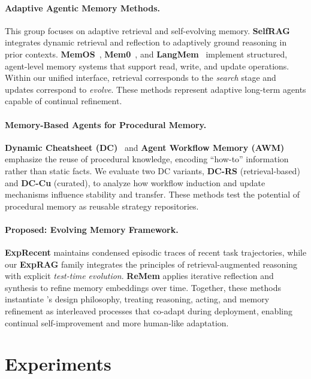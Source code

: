 \paragraph{Adaptive Agentic Memory Methods.}
This group focuses on adaptive retrieval and self-evolving memory. \textbf{SelfRAG}~\citep{asai2023self} integrates dynamic retrieval and reflection to adaptively ground reasoning in prior contexts.  
\textbf{MemOS}~\citep{Li2025MemOSAO}, \textbf{Mem0}~\citep{mem0}, and \textbf{LangMem}~\citep{langchain} implement structured, agent-level memory systems that support read, write, and update operations. Within our unified interface, retrieval corresponds to the \emph{search} stage and updates correspond to \emph{evolve}. These methods represent adaptive long-term agents capable of continual refinement.

\paragraph{Memory-Based Agents for Procedural Memory.}
\textbf{Dynamic Cheatsheet (DC)}~\citep{suzgun2025dynamic} and \textbf{Agent Workflow Memory (AWM)}~\citep{Wang2024AgentWM} emphasize the reuse of procedural knowledge, encoding “how-to” information rather than static facts.  
We evaluate two DC variants, \textbf{DC-RS} (retrieval-based) and \textbf{DC-Cu} (curated), to analyze how workflow induction and update mechanisms influence stability and transfer. These methods test the potential of procedural memory as reusable strategy repositories.

\paragraph{Proposed: Evolving Memory Framework.}
\textbf{ExpRecent} maintains condensed episodic traces of recent task trajectories, while our \textbf{ExpRAG} family integrates the principles of retrieval-augmented reasoning with explicit \emph{test-time evolution}. \textbf{ReMem} applies iterative reflection and synthesis to refine memory embeddings over time.  
Together, these methods instantiate \method's design philosophy, treating reasoning, acting, and memory refinement as interleaved processes that co-adapt during deployment, enabling continual self-improvement and more human-like adaptation.

\section{Experiments}

